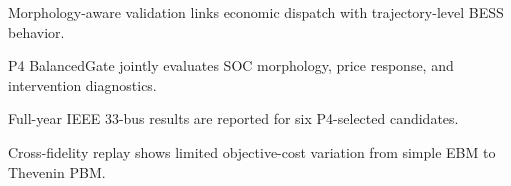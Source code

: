\begin{highlights}
\item Morphology-aware validation links economic dispatch with trajectory-level BESS behavior.
\item P4 BalancedGate jointly evaluates SOC morphology, price response, and intervention diagnostics.
\item Full-year IEEE 33-bus results are reported for six P4-selected candidates.
\item Cross-fidelity replay shows limited objective-cost variation from simple EBM to Thevenin PBM.
\end{highlights}

